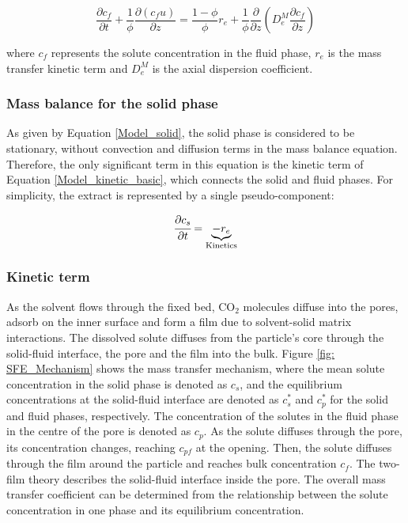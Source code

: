 \documentclass[a4paper,fleqn]{cas-dc}
\begin{document}
{\footnotesize
	\begin{equation}
		\label{Model_fluid}
		\frac{\partial c_f}{\partial t}
		+ \frac{1}{\phi} \frac{\partial \left( c_f u\right)}{\partial z}
		= \frac{1-\phi}{\phi} r_e
		+ \frac{1}{\phi} \frac{\partial}{\partial z} \left( D^M_e \frac{\partial c_f}{\partial z} \right)
	\end{equation}
}

where $c_f$ represents the solute concentration in the fluid phase, $r_e$ is the mass transfer kinetic term and $D^M_e$ is the axial dispersion coefficient.

\subsubsection{Mass balance for the solid phase} \label{Mass_balance_solid}

As given by Equation \ref{Model_solid}, the solid phase is considered to be stationary, without convection and diffusion terms in the mass balance equation. Therefore, the only significant term in this equation is the kinetic term of Equation \ref{Model_kinetic_basic}, which connects the solid and fluid phases. For simplicity, the extract is represented by a single pseudo-component: 

{\footnotesize
	\begin{equation} 
		\label{Model_solid}
				\cfrac{\partial c_s}{\partial t} = \underbrace{ -  r_e }_{\text{Kinetics}}
		\end{equation} }
		
		\subsubsection{Kinetic term} \label{CH: Kinetic}
		
		As the solvent flows through the fixed bed, CO$_2$ molecules diffuse into the pores, adsorb on the inner surface and form a film due to solvent-solid matrix interactions. The dissolved solute diffuses from the particle's core through the solid-fluid interface, the pore and the film into the bulk. Figure \ref{fig: SFE_Mechanism} shows the mass transfer mechanism, where the mean solute concentration in the solid phase is denoted as $c_s$, and the equilibrium concentrations at the solid-fluid interface are denoted as $c_s^*$ and $c_p^*$ for the solid and fluid phases, respectively. The concentration of the solutes in the fluid phase in the centre of the pore is denoted as $c_p$. As the solute diffuses through the pore, its concentration changes, reaching $c_{pf}$ at the opening. Then, the solute diffuses through the film around the particle and reaches bulk concentration $c_f$. The two-film theory describes the solid-fluid interface inside the pore. The overall mass transfer coefficient can be determined from the relationship between the solute concentration in one phase and its equilibrium concentration.
		
\end{document}
